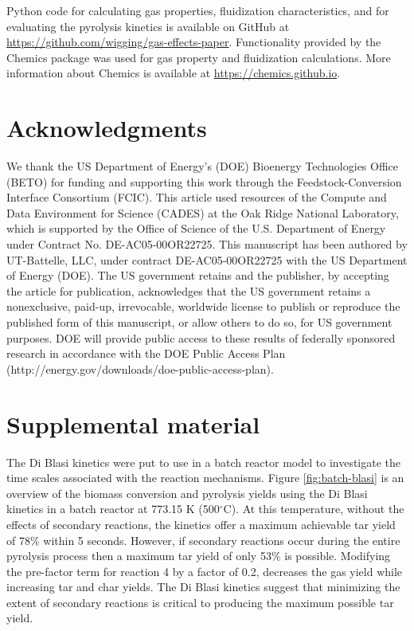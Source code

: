 \documentclass{article}
\begin{document}
Python code for calculating gas properties, fluidization characteristics, and for evaluating the pyrolysis kinetics is available on GitHub at \url{https://github.com/wigging/gas-effects-paper}. Functionality provided by the Chemics package was used for gas property and fluidization calculations. More information about Chemics is available at \url{https://chemics.github.io}.


\section{Acknowledgments}

We thank the US Department of Energy’s (DOE) Bioenergy Technologies Office (BETO) for funding and supporting this work through the Feedstock-Conversion Interface Consortium (FCIC). This article used resources of the Compute and Data Environment for Science (CADES) at the Oak Ridge National Laboratory, which is supported by the Office of Science of the U.S. Department of Energy under Contract No. DE-AC05-00OR22725. This manuscript has been authored by UT-Battelle, LLC, under contract DE-AC05-00OR22725 with the US Department of Energy (DOE). The US government retains and the publisher, by accepting the article for publication, acknowledges that the US government retains a nonexclusive, paid-up, irrevocable, worldwide license to publish or reproduce the published form of this manuscript, or allow others to do so, for US government purposes. DOE will provide public access to these results of federally sponsored research in accordance with the DOE Public Access Plan (http://energy.gov/downloads/doe-public-access-plan).


\section{Supplemental material}

The Di Blasi kinetics were put to use in a batch reactor model to investigate the time scales associated with the reaction mechanisms. Figure \ref{fig:batch-blasi} is an overview of the biomass conversion and pyrolysis yields using the Di Blasi kinetics in a batch reactor at 773.15 K (500$^\circ$C). At this temperature, without the effects of secondary reactions, the kinetics offer a maximum achievable tar yield of 78\% within 5 seconds. However, if secondary reactions occur during the entire pyrolysis process then a maximum tar yield of only 53\% is possible. Modifying the pre-factor term for reaction 4 by a factor of 0.2, decreases the gas yield while increasing tar and char yields. The Di Blasi kinetics suggest that minimizing the extent of secondary reactions is critical to producing the maximum possible tar yield.
\end{document}
